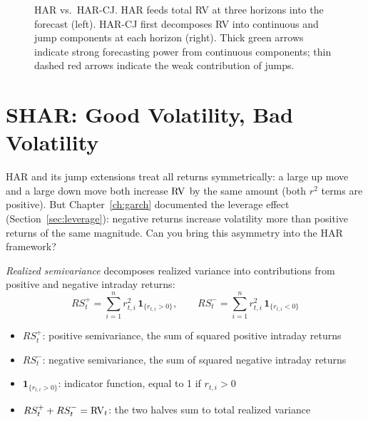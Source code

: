 \begin{figure}[htbp]
\caption{HAR vs.\ HAR-CJ.
HAR feeds total RV at three horizons into the forecast (left).
HAR-CJ first decomposes RV into continuous and jump components at each horizon (right).
Thick green arrows indicate strong forecasting power from continuous components; thin dashed red arrows indicate the weak contribution of jumps.}
\label{fig:har-cj-decomp}
\end{figure}


\section{SHAR: Good Volatility, Bad Volatility}
\label{sec:shar}

HAR and its jump extensions treat all returns symmetrically: a large up move and a large down move both increase $\operatorname{RV}$ by the same amount (both $r^2$ terms are positive).
But Chapter~\ref{ch:garch} documented the leverage effect (Section~\ref{sec:leverage}): negative returns increase volatility more than positive returns of the same magnitude.
Can you bring this asymmetry into the HAR framework?

\begin{prereq}
\emph{Realized semivariance} decomposes realized variance into contributions from positive and negative intraday returns:
\begin{equation}
  RS^+_t = \sum_{i=1}^{n} r^2_{t,i} \, \mathbf{1}_{\{r_{t,i} > 0\}}, \qquad
  RS^-_t = \sum_{i=1}^{n} r^2_{t,i} \, \mathbf{1}_{\{r_{t,i} < 0\}}
  \label{eq:semivariance}
\end{equation}
\begin{itemize}[nosep]
  \item $RS^+_t$: positive semivariance, the sum of squared positive intraday returns
  \item $RS^-_t$: negative semivariance, the sum of squared negative intraday returns
  \item $\mathbf{1}_{\{r_{t,i} > 0\}}$: indicator function, equal to 1 if $r_{t,i} > 0$
  \item $RS^+_t + RS^-_t = \operatorname{RV}_t$: the two halves sum to total realized variance
\end{itemize}
\end{prereq}

